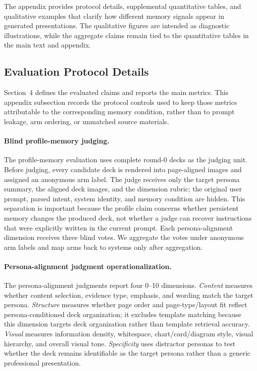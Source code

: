 \documentclass{llmxive}
\begin{document}
The appendix provides protocol details, supplemental quantitative tables, and
qualitative examples that clarify how different memory signals appear in
generated presentations. The qualitative figures are intended as diagnostic
illustrations, while the aggregate claims remain tied to the quantitative
tables in the main text and appendix.

\subsection{Evaluation Protocol Details}
\label{app:evaluation_protocol_details}

Section~4 defines the evaluated claims and reports the main metrics. This
appendix subsection records the protocol controls used to keep those metrics
attributable to the corresponding memory condition, rather than to prompt
leakage, arm ordering, or unmatched source materials.

\paragraph{Blind profile-memory judging.}
The profile-memory evaluation uses complete round-0 decks as the judging unit.
Before judging, every candidate deck is rendered into page-aligned images and
assigned an anonymous arm label. The judge receives only the target persona
summary, the aligned deck images, and the dimension rubric; the original user
prompt, parsed intent, system identity, and memory condition are hidden. This
separation is important because the profile claim concerns whether persistent
memory changes the produced deck, not whether a judge can recover instructions
that were explicitly written in the current prompt. Each persona-alignment
dimension receives three blind votes. We aggregate the votes under anonymous
arm labels and map arms back to systems only after aggregation.

\paragraph{Persona-alignment judgment operationalization.}
The persona-alignment judgments report four 0--10 dimensions. \textit{Content}
measures whether content selection, evidence type, emphasis, and wording match
the target persona. \textit{Structure} measures whether page order and
page-type/layout fit reflect persona-conditioned deck organization; it excludes
template matching because this dimension targets deck organization rather than
template retrieval accuracy. \textit{Visual} measures information density,
whitespace, chart/card/diagram style, visual hierarchy, and overall visual tone.
\textit{Specificity} uses distractor personas to test whether the deck remains
identifiable as the target persona rather than a generic professional
presentation.
\end{document}
